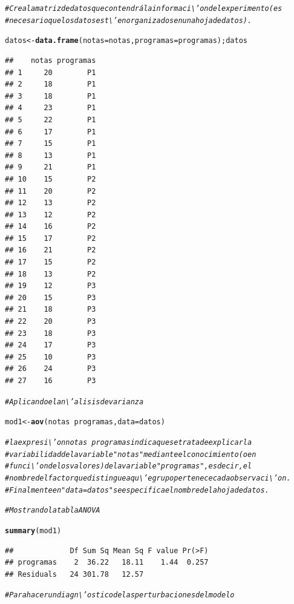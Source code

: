 \documentclass[12pt,letterpaper]{article}\usepackage[]{graphicx}\usepackage[]{color}
\makeatletter
\newcommand{\hlcom}[1]{\textcolor[rgb]{0.678,0.584,0.686}{\textit{#1}}}%
\newcommand{\hlopt}[1]{\textcolor[rgb]{0,0,0}{#1}}%
\newcommand{\hlstd}[1]{\textcolor[rgb]{0.345,0.345,0.345}{#1}}%
\newcommand{\hlkwb}[1]{\textcolor[rgb]{0.69,0.353,0.396}{#1}}%
\newcommand{\hlkwc}[1]{\textcolor[rgb]{0.333,0.667,0.333}{#1}}%
\newcommand{\hlkwd}[1]{\textcolor[rgb]{0.737,0.353,0.396}{\textbf{#1}}}%
\newenvironment{kframe}{%
 \def\at@end@of@kframe{}%
 \ifinner\ifhmode%
  \def\at@end@of@kframe{\end{minipage}}%
  \begin{minipage}{\columnwidth}%
 \fi\fi%
 \def\FrameCommand##1{\hskip\@totalleftmargin \hskip-\fboxsep
 \colorbox{shadecolor}{##1}\hskip-\fboxsep
     \hskip-\linewidth \hskip-\@totalleftmargin \hskip\columnwidth}%
 \MakeFramed {\advance\hsize-\width
   \@totalleftmargin\z@ \linewidth\hsize
   \@setminipage}}%
 {\par\unskip\endMakeFramed%
 \at@end@of@kframe}
\newenvironment{knitrout}{}{} %
\makeatother
\begin{document}
\begin{itemize}
\begin{knitrout}
\begin{kframe}
\begin{alltt}
\hlcom{#Crea la matriz de datos que contendrá la informaci\textbackslash{}'on del experimento (es }
\hlcom{# necesario que los datos est\textbackslash{}'en organizados en una hoja de datos).}

\hlstd{datos} \hlkwb{<-} \hlkwd{data.frame}\hlstd{(}\hlkwc{notas} \hlstd{= notas,} \hlkwc{programas} \hlstd{= programas);datos}
\end{alltt}
\begin{verbatim}
##    notas programas
## 1     20        P1
## 2     18        P1
## 3     18        P1
## 4     23        P1
## 5     22        P1
## 6     17        P1
## 7     15        P1
## 8     13        P1
## 9     21        P1
## 10    15        P2
## 11    20        P2
## 12    13        P2
## 13    12        P2
## 14    16        P2
## 15    17        P2
## 16    21        P2
## 17    15        P2
## 18    13        P2
## 19    12        P3
## 20    15        P3
## 21    18        P3
## 22    20        P3
## 23    18        P3
## 24    17        P3
## 25    10        P3
## 26    24        P3
## 27    16        P3
\end{verbatim}
\begin{alltt}
\hlcom{#Aplicando el an\textbackslash{}'alisis de varianza}

\hlstd{mod1} \hlkwb{<-} \hlkwd{aov}\hlstd{(notas} \hlopt{~} \hlstd{programas,} \hlkwc{data} \hlstd{= datos)}

\hlcom{# la expresi\textbackslash{}'on notas ~ programas indica que se trata de explicar la }
\hlcom{# variabilidad de la variable "notas" mediante el conocimiento (o en }
\hlcom{# funci\textbackslash{}'on de los valores) de la variable "programas", es decir, el }
\hlcom{# nombre del factor que distingue a qu\textbackslash{}'e grupo pertenece cada observaci\textbackslash{}'on. }
\hlcom{# Finalmente en "data = datos" se especifica el nombre de la hoja de datos.}

\hlcom{# Mostrando la tabla ANOVA }

\hlkwd{summary}\hlstd{(mod1)}
\end{alltt}
\begin{verbatim}
##             Df Sum Sq Mean Sq F value Pr(>F)
## programas    2  36.22   18.11    1.44  0.257
## Residuals   24 301.78   12.57
\end{verbatim}
\begin{alltt}
\hlcom{# Para hacer un diagn\textbackslash{}'ostico de las perturbaciones del modelo }


\end{alltt}
\end{kframe}
\end{knitrout}
\end{itemize}
\end{document}
